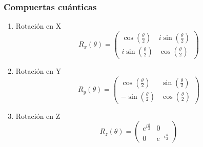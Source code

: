 \documentclass[xetex,mathserif,serif]{beamer}
\begin{document}
\begin{frame}
    \frametitle{Compuertas cuánticas}

    \begin{enumerate}
        \item Rotación en X
            \[
            R_x(\theta) =
            \begin{pmatrix}
            \cos(\frac{\theta}{2}) & i \sin(\frac{\theta}{2}) \\
            i\sin(\frac{\theta}{2}) & \cos(\frac{\theta}{2})
            \end{pmatrix}
            \]

        \item Rotación en Y
            \[
            R_y(\theta) =
            \begin{pmatrix}
            \cos(\frac{\theta}{2}) & \sin(\frac{\theta}{2}) \\
            -\sin(\frac{\theta}{2}) & \cos(\frac{\theta}{2})
            \end{pmatrix}
            \]

        \item Rotación en Z
            \[
            R_z(\theta) =
            \begin{pmatrix}
            e^{i \frac{\theta}{2}} & 0 \\
            0 & e^{-i \frac{\theta}{2}}
            \end{pmatrix}
            \]

    \end{enumerate}

\end{frame}
\end{document}
